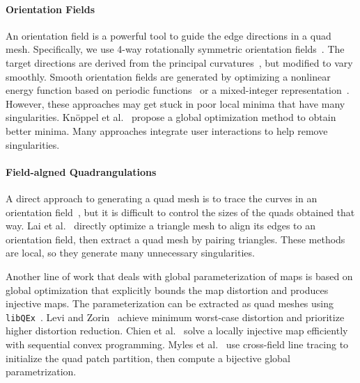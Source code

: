 \paragraph*{Orientation Fields}
An orientation field is a powerful tool to guide the edge directions in a quad mesh. Specifically, we use 4-way rotationally symmetric orientation fields~\cite{ray2008n,lai2010metric}. The target directions are derived from the principal curvatures~\cite{cohen2003restricted,cazals2005estimating}, but modified to vary smoothly. Smooth orientation fields are generated by optimizing a nonlinear energy function based on periodic functions~\cite{hertzmann2000illustrating,ray2009geometry} or a mixed-integer representation~\cite{ray2008n,bommes2009mixed}. However, these approaches may get stuck in poor local minima that have many singularities. Kn\"{o}ppel et al.~\cite{knoppel2013globally} propose a global optimization method to obtain better minima. Many approaches \cite{ray2008n,ray2009geometry,crane2010trivial,diamanti2014designing,jiang2015frame} integrate user interactions to help remove singularities.

\paragraph*{Field-algned Quadrangulations}
A direct approach to generating a quad mesh is to trace the curves in an orientation field~\cite{alliez2003anisotropic}, but it is difficult to control the sizes of the quads obtained that way. Lai et al.~\cite{lai2008incremental} directly optimize a triangle mesh to align its edges to an orientation field, then extract a quad mesh by pairing triangles. These methods are local, so they generate many unnecessary singularities.

Another line of work that deals with global parameterization of maps is based on global optimization that explicitly bounds the map distortion and produces injective maps. The parameterization can be extracted as quad meshes using \texttt{libQEx}~\cite{ebke2013qex}. Levi and Zorin~\cite{levi2014strict} achieve minimum worst-case distortion and prioritize higher distortion reduction. Chien et al.~\cite{chien2016bounded} solve a locally injective map efficiently with sequential convex programming. Myles et al.~\cite{myles2014robust} use cross-field line tracing to initialize the quad patch partition, then compute a bijective global parametrization.

